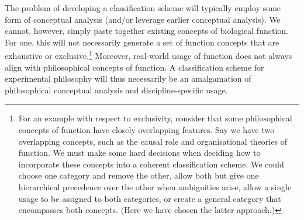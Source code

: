 \documentclass{article}
\begin{document}
The problem of developing a classification scheme will typically employ some form of conceptual analysis (and/or leverage earlier conceptual analysis).
We cannot, however, simply paste together existing concepts of biological function.
For one, this will not necessarily generate a set of function concepts that are exhaustive or exclusive.\footnote{For an example with respect to exclusivity, consider that some philosophical concepts of function have closely overlapping features. Say we have two overlapping concepts, such as the causal role and organisational theories of function. We must make some hard decisions when deciding how to incorporate these concepts into a coherent classification scheme. We could choose one category and remove the other, allow both but give one hierarchical precedence over the other when ambiguities arise, allow a single usage to be assigned to both categories, or create a general category that encompasses both concepts. (Here we have chosen the latter approach.)}
Moreover, real-world usage of function does not always align with philosophical concepts of function.
A classification scheme for experimental philosophy will thus necessarily be an amalgamation of philosophical conceptual analysis and discipline-specific usage.
\end{document}
